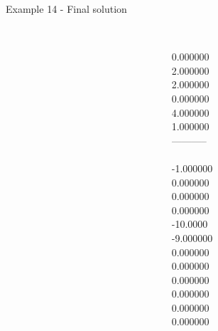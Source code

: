 \begin{frame}{Example 14 - Final solution}
\begin{columns}[t]
\begin{column}{0.3\textwidth}
\end{column}  

\begin{column}{0.3\textwidth}
\\
0.000000\\
2.000000\\
2.000000\\
0.000000\\
4.000000\\
1.000000\\

-----------\\
\\
-1.000000\\
0.000000\\
0.000000\\
0.000000\\
-10.0000\\
-9.000000\\
0.000000\\
0.000000\\
0.000000\\
0.000000\\
0.000000\\
0.000000\\
\end{column}
\end{columns}
\end{frame}
